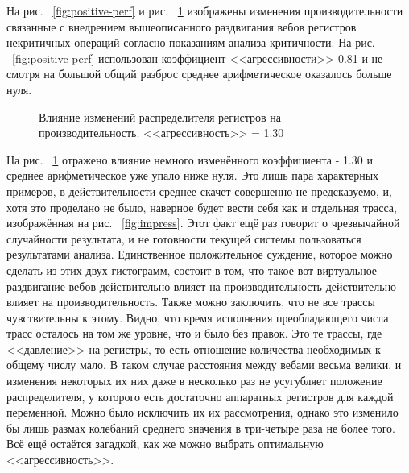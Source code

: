 \documentclass[a4paper,12pt,titlepage]{article}
\newcommand*{\fig}[1]{рис. ~{\ref{fig:#1}}}
\begin{document}
На \fig{positive-perf} и \fig{negative-perf} изображены изменения производительности связанные с внедрением вышеописанного раздвигания вебов регистров некритичных операций согласно показаниям анализа критичности. На \fig{positive-perf} использован коэффициент <<агрессивности>> 0.81 и не смотря на большой общий разброс среднее арифметическое оказалось больше нуля.
\begin{figure}[h]

\caption{Влияние изменений распределителя регистров на производительность. <<агрессивность>> = 1.30}
\label{fig:negative-perf}
\end{figure}

На \fig{negative-perf} отражено влияние немного изменённого коэффициента - 1.30 и среднее арифметическое уже упало ниже нуля.
Это лишь пара характерных примеров, в действительности среднее скачет совершенно не предсказуемо, и, хотя это проделано не было, наверное будет вести себя как и отдельная трасса, изображённая на \fig{impress}. Этот факт ещё раз говорит о чрезвычайной случайности результата, и не готовности текущей системы пользоваться результатами анализа. Единственное положительное суждение, которое можно сделать из этих двух гистограмм, состоит в том, что такое вот виртуальное раздвигание вебов действительно влияет на производительность действительно влияет на производительность. Также можно заключить, что не все трассы чувствительны к этому. Видно, что время исполнения преобладающего числа трасс осталось на том же уровне, что и было без правок. Это те трассы, где <<давление>> на регистры, то есть отношение количества необходимых к общему числу мало. В таком случае расстояния между вебами весьма велики, и изменения некоторых их них даже в несколько раз не усугубляет положение распределителя, у которого есть достаточно аппаратных регистров для каждой переменной. Можно было исключить их их рассмотрения, однако это изменило бы лишь размах колебаний среднего значения в три-четыре раза не более того. Всё ещё остаётся загадкой, как же можно выбрать оптимальную <<агрессивность>>.
\end{document}
